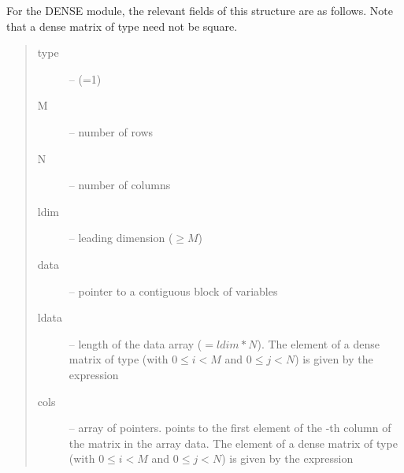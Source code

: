 \documentclass[letterpaper,10pt,english]{sphinxmanual}
\begin{document}
For the DENSE module, the relevant fields of this structure are as
follows. Note that a dense matrix of type {\hyperref[linear_solvers/DLS:DlsMat]{}} need not be
square.
\begin{quote}\begin{description}
\item[{type}] \leavevmode
--  (=1)

\item[{M}] \leavevmode
-- number of rows

\item[{N}] \leavevmode
--  number of columns

\item[{ldim}] \leavevmode
-- leading dimension ($\ge M$)

\item[{data}] \leavevmode
-- pointer to a contiguous block of  variables

\item[{ldata}] \leavevmode
-- length of the data array ($= ldim*N$). The
 element of a dense matrix  of type  (with
$0 \le i < M$ and $0 \le j < N$) is given by the
expression 

\item[{cols}] \leavevmode
-- array of pointers.  points to the first element
of the -th column of the matrix in the array data. The
 element of a dense matrix  of type  (with
$0 \le i < M$ and $0 \le j < N$) is given by the
expression 

\end{description}\end{quote}
\end{document}
